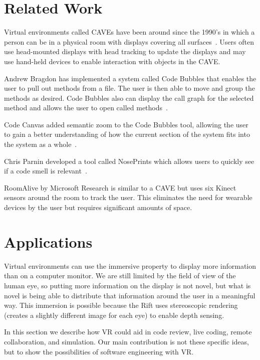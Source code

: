 \documentclass{acm_proc_article-sp}
\begin{document}
\section{Related Work}
Virtual environments called CAVEs have been around since the 1990's in which a person can be in a physical room with displays covering all surfaces~\cite{Cruz-Neira:CAVE}.  Users often use head-mounted displays with head tracking to update the displays and may use hand-held devices to enable interaction with objects in the CAVE.

Andrew Bragdon has implemented a system called Code Bubbles that enables the user to pull out methods from a file. The user is then able to move and group the methods as desired.  Code Bubbles also can display the call graph for the selected method and allows the user to open called methods~\cite{Bragdon:CodeBubbles}.

Code Canvas added semantic zoom to the Code Bubbles tool, allowing the user to gain a better understanding of how the current section of the system fits into the system as a whole~\cite{DeLine:CodeCanvas}.

Chris Parnin developed a tool called NosePrints which allows users to quickly see if a code smell is relevant~\cite{parnin:Noseprints}.

RoomAlive by Microsoft Research is similar to a CAVE but uses six Kinect sensors around the room to track the user.  This eliminates the need for wearable devices by the user but requires significant amounts of space.~\cite{Jones:RoomAlive}

\section{Applications}
Virtual environments can use the immersive property to display more information than on a computer monitor. We are still limited by the field of view of the human eye, so putting more information on the display is not novel, but what is novel is being able to distribute that information around the user in a meaningful way. This immersion is possible because the Rift uses stereoscopic rendering (creates a slightly different image for each eye) to enable depth sensing.

In this section we describe how VR could aid in code review, live coding, remote collaboration, and simulation. Our main contribution is not these specific ideas, but to show the possibilities of software engineering with VR.
\end{document}
